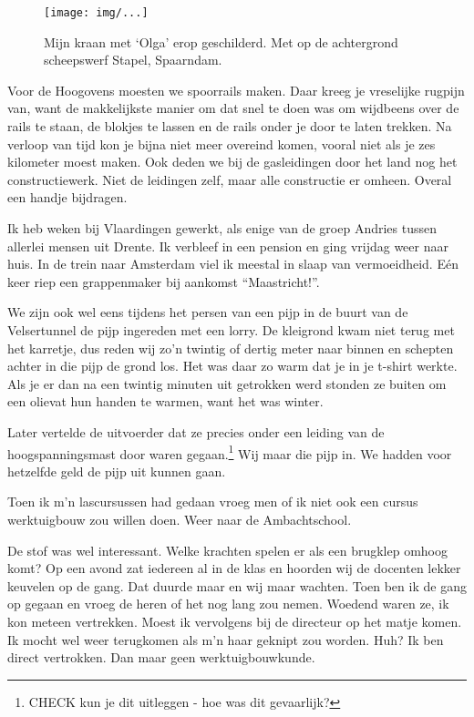 \documentclass[10pt,twoside,openright]{memoir}
\begin{document}
\begin{figure}[t]
\texttt{[image: img/...]}
\caption{Mijn kraan met ‘Olga’ erop geschilderd. Met op de achtergrond scheepswerf Stapel, Spaarndam.}
\end{figure}

Voor de Hoogovens moesten we spoorrails maken. Daar kreeg je vreselijke rugpijn van, want de makkelijkste manier om dat snel te doen was om wijdbeens over de rails te staan, de blokjes te lassen en de rails onder je door te laten trekken. Na verloop van tijd kon je bijna niet meer overeind komen, vooral niet als je zes kilometer moest maken. Ook deden we bij de gasleidingen door het land nog het constructiewerk. Niet de leidingen zelf, maar alle constructie er omheen. Overal een handje bijdragen.

Ik heb weken bij Vlaardingen gewerkt, als enige van de groep Andries tussen allerlei mensen uit Drente. Ik verbleef in een pension en ging vrijdag weer naar huis. In de trein naar Amsterdam viel ik meestal in slaap van vermoeidheid. Eén keer riep een grappenmaker bij aankomst ``Maastricht!''. 

We zijn ook wel eens tijdens het persen van een pijp in de buurt van de Velsertunnel de pijp ingereden met een lorry. De kleigrond kwam niet terug met het karretje, dus reden wij zo'n twintig of dertig meter naar binnen en schepten achter in die pijp de grond los. Het was daar zo warm dat je in je t-shirt werkte. Als je er dan na een twintig minuten uit getrokken werd stonden ze buiten om een olievat hun handen te warmen, want het was winter. 

Later vertelde de uitvoerder dat ze precies onder een leiding van de hoogspanningsmast door waren gegaan.\footnote{CHECK kun je dit uitleggen - hoe was dit gevaarlijk?} Wij maar die pijp in. We hadden voor hetzelfde geld de pijp uit kunnen gaan.

Toen ik m’n lascursussen had gedaan vroeg men of ik niet ook een cursus werktuigbouw zou willen doen. Weer naar de Ambachtschool. 

De stof was wel interessant. Welke krachten spelen er als een brugklep omhoog komt? Op een avond zat iedereen al in de klas en hoorden wij de docenten lekker keuvelen op de gang. Dat duurde maar en wij maar wachten. Toen ben ik de gang op gegaan en vroeg de heren of het nog lang zou nemen. Woedend waren ze, ik kon meteen vertrekken. Moest ik vervolgens bij de directeur op het matje komen. Ik mocht wel weer terugkomen als m’n haar geknipt zou worden. Huh? Ik ben direct vertrokken. Dan maar geen werktuigbouwkunde.
\end{document}
